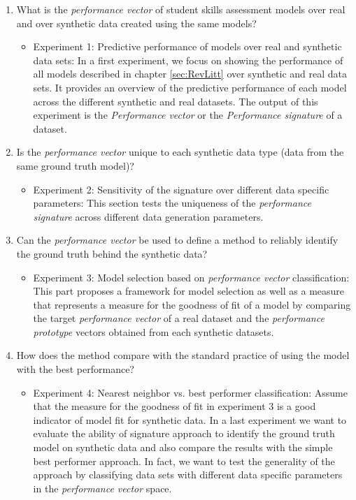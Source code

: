 \begin{enumerate}
\item What is the \textit{performance vector} of student skills assessment models over real and over synthetic data created using the same models?
\begin{itemize}
\item Experiment 1: Predictive performance of models over real and synthetic data sets: In a first experiment, we focus on showing the performance of all models described in chapter \ref{sec:RevLitt} over synthetic and real data sets.  It provides an overview of the predictive performance of each model across the different synthetic and real datasets. The output of this experiment is the \textit{Performance vector} or the \textit{Performance signature} of a dataset.
\end{itemize}
\item Is the \textit{performance vector} unique to each synthetic data type (data from the same ground truth model)?
\begin{itemize}
\item Experiment 2: Sensitivity of the signature over different data specific parameters: This section tests the uniqueness of the \textit{performance signature} across different data generation parameters.
\end{itemize}
\item Can the \textit{performance vector} be used to define a method to reliably identify the ground truth behind the synthetic data?
\begin{itemize}
\item Experiment 3: Model selection based on \textit{performance vector} classification: This part proposes a framework for model selection as well as a measure that represents a measure for the goodness of fit of a model by comparing the target \textit{performance vector} of a real dataset and the \textit{performance prototype} vectors obtained from each synthetic datasets.
\end{itemize}
\item How does the method compare with the standard practice of using the model with the best performance?
\begin{itemize}

\item Experiment 4: Nearest neighbor vs. best performer classification: Assume that the measure for the goodness of fit in experiment 3 is a good indicator of model fit for synthetic data. In a last experiment we want to evaluate the ability of signature approach to identify the ground truth model on synthetic data and also compare the results with the simple best performer approach. In fact, we want to test the generality of the approach by classifying data sets with different data specific parameters in the \textit{performance vector} space. 


\end{itemize}
\end{enumerate}
